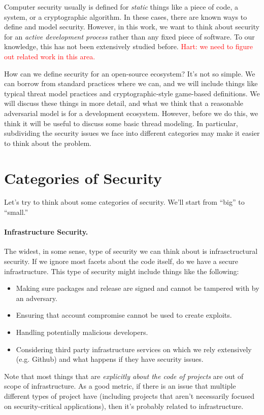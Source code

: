 
Computer security usually is defined for \emph{static} things like a piece of code, a system, or a cryptographic algorithm.  In these cases, there are known ways to define and model security.  However, in this work, we want to think about security for an \emph{active development process} rather than any fixed piece of software.  To our knowledge, this has not been extensively studied before.  \textcolor{red}{Hart:  we need to figure out related work in this area.}

How can we define security for an open-source ecosystem?  It's not so simple.  We can borrow from standard practices where we can, and we will include things like typical threat model practices and cryptographic-style game-based definitions.  We will discuss these things in more detail, and what we think that a reasonable adversarial model is for a development ecosystem.  However, before we do this, we think it will be useful to discuss some basic thread modeling.  In particular, subdividing the security issues we face into different categories may make it easier to think about the problem.

\section{Categories of Security}
Let's try to think about some categories of security.  We'll start from ``big'' to ``small.''

\paragraph{Infrastructure Security.}  The widest, in some sense, type of security we can think about is infrasctructural security.  If we ignore most facets about the code itself, do we have a secure infrastructure.  This type of security might include things like the following:
\begin{itemize}
\item Making sure packages and release are signed and cannot be tampered with by an adversary.
\item Ensuring that account compromise cannot be used to create exploits.
\item Handling potentially malicious developers.
\item Considering third party infrastructure services on which we rely extensively (e.g. Github) and what happens if they have security issues.
\end{itemize}
Note that most things that are \emph{explicitly about the code of projects} are out of scope of infrastructure.  As a good metric, if there is an issue that multiple different types of project have (including projects that aren't necessarily focused on security-critical applications), then it's probably related to infrastructure.

